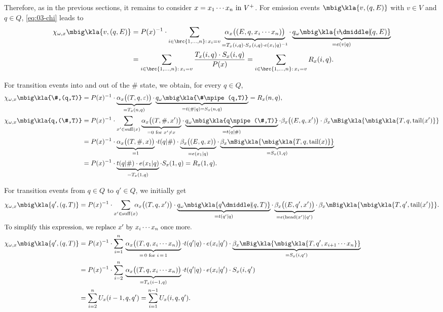 Therefore, as in the previous sections, it remains to consider $x=x_1\cdots
x_n\text{ in } V^+$. For emission events $\mbig\kla{v,(q,E)}$ with $v\in V$ and $q\in
Q$, \eqref{eq:03-chi} leads to
\begin{align*}
 \chi_{\omega,x}\mbig\kla{v,(q,E)}
 &= P(x)^{-1} \cdot \sum_{i\in\brc{1,\ldots,n}:\, x_i=v} \underbrace{\alpha_x\doublekla{E,q,x_i\cdots x_n}}_{=T_x(i,q)\cdot S_x(i,q)\cdot e(x_i|q)^{-1}} \cdot \underbrace{q_\omega\mbig\kla{v\npipe(q,E)}}_{=e(v|q)} \\
 &= \sum_{i\in\brc{1,\ldots,n}:\, x_i=v} \frac{T_x(i,q)\cdot S_x(i,q)}{P(x)}
  = \sum_{i\in\brc{1,\ldots,n}:\, x_i=v} R_x(i,q).
\end{align*}

For transition events into and out of the $\#$ state, we obtain, for every $q\in Q$,
\begin{align*}
 \chi_{\omega,x}\mbig\kla{\#,(q,T)}
 &= P(x)^{-1} \cdot \underbrace{\alpha_x\doublekla{T,q,\eps}}_{=T_x(n,q)} \cdot \underbrace{q_\omega\mbig\kla{\#\npipe(q,T)}}_{=t(\#|q)=S_x(n,q)} = R_x(n,q), \\
 \chi_{\omega,x}\mbig\kla{q,(\#,T)}
 &= P(x)^{-1} \cdot \sum_{x'\in\suff(x)} \underbrace{\alpha_x\doublekla{T,\#,x'}}_{=0\text{ for }x'\neq x} \cdot \underbrace{q_\omega\mbig\kla{q\npipe(\#,T)}}_{=t(q|\#)} \cdot \beta_x\doublekla{E,q,x'} \cdot \beta_x\mBig\kla{\mbig\kla{T,q,\cdr(x')}} \\
 &= P(x)^{-1} \cdot \underbrace{\alpha_x\doublekla{T,\#,x}}_{=1} \cdot t(q|\#) \cdot \underbrace{\beta_x\doublekla{E,q,x}}_{=e(x_1|q)} \cdot \underbrace{\beta_x\mBig\kla{\mbig\kla{T,q,\cdr(x)}}}_{=S_x(1,q)} \\
 &= P(x)^{-1} \cdot \underbrace{t(q|\#) \cdot e(x_1|q)}_{=T_x(1,q)} \cdot S_x(1,q)
  = R_x(1,q).
\end{align*}

For transition events from $q\in Q$ to $q'\in Q$, we initially get
\begin{align*}
 \chi_{\omega,x}\mbig\kla{q',(q,T)}
 &= P(x)^{-1} \cdot \sum_{x'\in\suff(x)} \!\!\!\!\alpha_x\doublekla{T,q,x'} \cdot \underbrace{q_\omega\mbig\kla{q'\npipe(q,T)}}_{=t(q'|q)} \cdot \underbrace{\beta_x\doublekla{E,q',x'}}_{=e(\car(x')|q')} \cdot\, \beta_x\mBig\kla{\mbig\kla{T,q',\cdr(x')}}. \\
 \intertext{To simplify this expression, we replace $x'$ by $x_i\cdots x_n$ once more.}
 \chi_{\omega,x}\mbig\kla{q',(q,T)}
 &= P(x)^{-1} \cdot \sum_{i=1}^n \,\underbrace{\alpha_x\doublekla{T,q,x_i\cdots x_n}}_{=\,0\text{ for }i\,=\,1} \cdot t(q'|q) \cdot e(x_i|q') \cdot \underbrace{\beta_x\mBig\kla{\mbig\kla{T,q',x_{i+1}\cdots x_n}}}_{=S_x(i,q')} \\
 &= P(x)^{-1} \cdot \sum_{i=2}^n \,\underbrace{\alpha_x\doublekla{T,q,x_i\cdots x_n}}_{=T_x(i-1,q)} \cdot t(q'|q) \cdot e(x_i|q') \cdot S_x(i,q') \\
 &= \sum_{i=2}^n U_x(i-1,q,q') = \sum_{i=1}^{n-1} U_x(i,q,q').
\end{align*}

